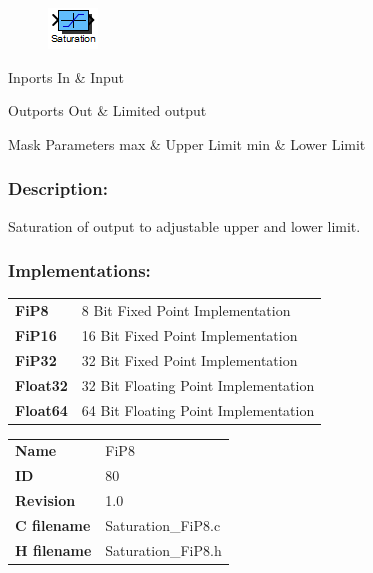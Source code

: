 \label{block:Saturation}
\begin{figure}[H]\includegraphics{Saturation}\end{figure} 

\begin{XtoCtabular}{Inports}
In & Input\tabularnewline
\hline
\end{XtoCtabular}


\begin{XtoCtabular}{Outports}
Out & Limited output\tabularnewline
\hline
\end{XtoCtabular}

\begin{XtoCtabular}{Mask Parameters}
max & Upper Limit\tabularnewline
\hline
min & Lower Limit\tabularnewline
\hline
\end{XtoCtabular}

\subsubsection*{Description:}
Saturation of output to adjustable upper and lower limit.


\subsubsection*{Implementations:}
\begin{tabular}{l l}
\textbf{FiP8} & 8 Bit Fixed Point Implementation\tabularnewline
\textbf{FiP16} & 16 Bit Fixed Point Implementation\tabularnewline
\textbf{FiP32} & 32 Bit Fixed Point Implementation\tabularnewline
\textbf{Float32} & 32 Bit Floating Point Implementation\tabularnewline
\textbf{Float64} & 64 Bit Floating Point Implementation\tabularnewline
\end{tabular}

\nopagebreak[0]
\begin{tabular}{l l}
\textbf{Name} & FiP8 \tabularnewline
\textbf{ID} & 80 \tabularnewline
\textbf{Revision} & 1.0 \tabularnewline
\textbf{C filename} & Saturation\_FiP8.c \tabularnewline
\textbf{H filename} & Saturation\_FiP8.h \tabularnewline
\end{tabular}
\vspace{1ex}

